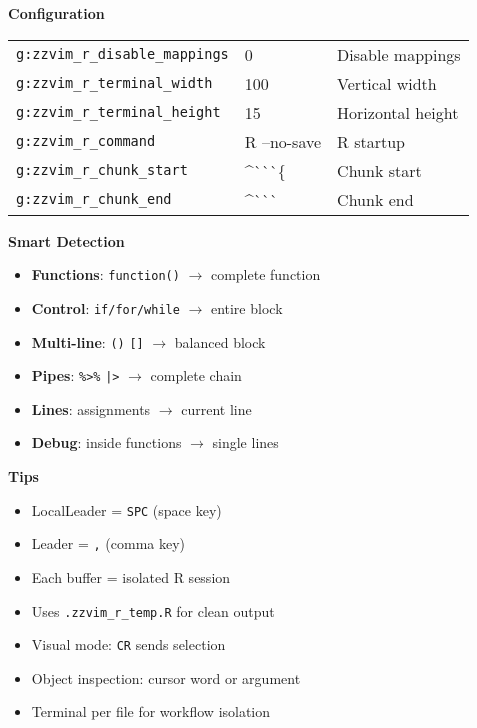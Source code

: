 \documentclass[10pt,landscape,a4paper]{article}
\begin{document}
\begin{multicols}{3}
\vspace{6pt}
\textbf{\large Configuration}\\
\begin{tabular}{@{}L{2.0cm}L{1.0cm}L{1.2cm}@{}}
\texttt{g:zzvim\_r\_disable\_mappings} & 0 & Disable mappings \\
\texttt{g:zzvim\_r\_terminal\_width} & 100 & Vertical width \\
\texttt{g:zzvim\_r\_terminal\_height} & 15 & Horizontal height \\
\texttt{g:zzvim\_r\_command} & R --no-save & R startup \\
\texttt{g:zzvim\_r\_chunk\_start} & \^{}\`{}\`{}\`{}\{ & Chunk start \\
\texttt{g:zzvim\_r\_chunk\_end} & \^{}\`{}\`{}\`{} & Chunk end \\
\end{tabular}

\vspace{6pt}
\textbf{\large Smart Detection}
\begin{itemize}
\item \textbf{Functions}: \texttt{function()} $\rightarrow$ complete function
\item \textbf{Control}: \texttt{if/for/while} $\rightarrow$ entire block  
\item \textbf{Multi-line}: \texttt{()} \texttt{[]} $\rightarrow$ balanced block
\item \textbf{Pipes}: \texttt{\%>\%} \texttt{|>} $\rightarrow$ complete chain
\item \textbf{Lines}: assignments $\rightarrow$ current line
\item \textbf{Debug}: inside functions $\rightarrow$ single lines
\end{itemize}

\vspace{6pt}
\textbf{\large Tips}
\begin{itemize}
\item LocalLeader = \texttt{SPC} (space key)
\item Leader = \texttt{,} (comma key)
\item Each buffer = isolated R session
\item Uses \texttt{.zzvim\_r\_temp.R} for clean output
\item Visual mode: \texttt{CR} sends selection
\item Object inspection: cursor word or argument
\item Terminal per file for workflow isolation
\end{itemize}

\end{multicols}
\end{document}
